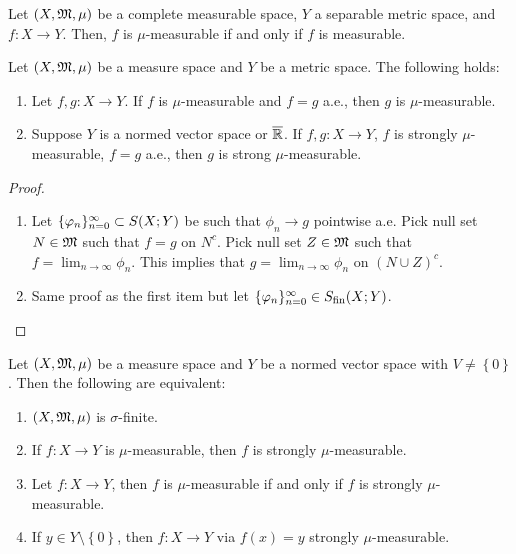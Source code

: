 \documentclass[a4paper]{article}
\begin{document}
\begin{cor}
  Let $(X, \mathfrak{M}, \mu)$ be a complete measurable space,
  $Y$ a separable metric space, and $f: X \to Y$. 
  Then, $f$ is $\mu$-measurable if and only if 
  $f$ is measurable.
\end{cor}

\begin{prop}
  Let $(X, \mathfrak{M}, \mu)$ be a measure space and $Y$ be a metric 
  space. The following holds: 
  \begin{enumerate}
    \item Let $f, g: X \to Y$. If $f$ is $\mu$-measurable
    and $f = g$ a.e., then $g$ is $\mu$-measurable.

    \item Suppose $Y$ is a normed vector space or 
    $\overline{\mathbb{R}}$. If $f, g: X \to Y$, $f$ is strongly 
    $\mu$-measurable, $f = g$ a.e., then 
    $g$ is strong $\mu$-measurable.
  \end{enumerate}
\end{prop}

\begin{proof}
  \begin{enumerate}
    \item Let $\{ \varphi_n \}_{n=0}^\infty \subset S(X; Y)$ be such that 
    $\phi_n \to g$ pointwise a.e. Pick null set 
    $N \in \mathfrak{M}$ such that $f = g$ on $N^c$. Pick 
    null set $Z \in \mathfrak{M}$ such that $f = \lim_{n \to \infty}
    \phi_n$. This implies that 
    $g = \lim_{n \to \infty} \phi_n$ on $(N \cup Z)^c$. 

    \item Same proof as the first item but let 
    $\{ \varphi_n \}_{n=0}^\infty \in S_{\text{fin}}(X; Y)$.
  \end{enumerate}

\end{proof}

\begin{thm}
  Let $(X,\mathfrak{M}, \mu)$ be a measure space and 
  $Y$ be a normed vector space with $V \neq \left\{ 0 
  \right\}$. Then the following are equivalent:
  \begin{enumerate}
    \item $(X, \mathfrak{M}, \mu)$ is $\sigma$-finite.
    \item If $f: X \to Y$ is $\mu$-measurable, then 
    $f$ is strongly $\mu$-measurable.
    \item Let $f: X \to Y$, then $f$ is $\mu$-measurable
    if and only if $f$ is strongly $\mu$-measurable.
    \item If $y \in Y \setminus \left\{ 0 \right\}$, 
    then $f: X \to Y$ via $f(x) = y$ strongly 
    $\mu$-measurable.
  \end{enumerate}
\end{thm}
\end{document}
